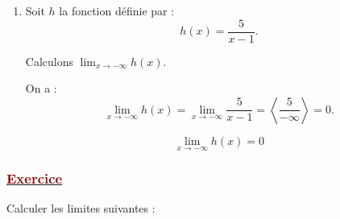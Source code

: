 \documentclass[12pt,a4paper]{article}
\begin{document}
\begin{enumerate}
    Étudions le signe de \(x^2-3x+2\).

    \[
        x^2-3x+2=0
        \quad\Longrightarrow\quad
        x=1\text{ ou }x=2
    \]

\begin{center}
\end{center}

    \(x^2-3x+2\) est négatif à gauche de \(2\).
    Donc,
    \[
        \lim_{x\to2^-}g(x)
        =
        \left\langle\frac{-3}{0^-}\right\rangle
        =+\infty.
    \]

    \[
        \boxed{\displaystyle\lim_{x\to2^-}g(x)=+\infty}
    \]

    \bigskip

    \item Soit \(h\) la fonction définie par :
    \[
        h(x)=\frac{5}{x-1}.
    \]

    Calculons \(\displaystyle\lim_{x\to-\infty}h(x)\).

    On a :
    \[
        \lim_{x\to-\infty}h(x)
        =
        \lim_{x\to-\infty}\frac{5}{x-1}
        =
        \left\langle\frac{5}{-\infty}\right\rangle
        =0.
    \]

    \[
        \boxed{\displaystyle\lim_{x\to-\infty}h(x)=0}
    \]

\end{enumerate}

\subsubsection*{\underline{\textcolor{darkred}{ Exercice }}} 
Calculer les limites suivantes :
\end{document}
